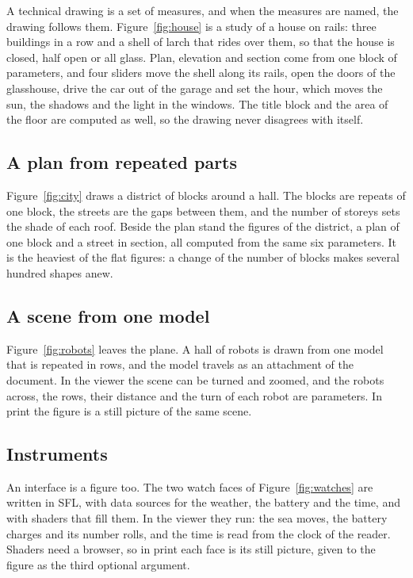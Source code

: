 \documentclass[10pt,twocolumn]{article}
\begin{document}
A technical drawing is a set of measures, and when the measures are named, the drawing follows them. Figure~\ref{fig:house} is a study
of a house on rails: three buildings in a row and a shell of larch that rides over them, so that the house is closed, half open or all
glass. Plan, elevation and section come from one block of parameters, and four sliders move the shell along its rails, open the doors
of the glasshouse, drive the car out of the garage and set the hour, which moves the sun, the shadows and the light in the windows. The
title block and the area of the floor are computed as well, so the drawing never disagrees with itself.

\subsection{A plan from repeated parts}

Figure~\ref{fig:city} draws a district of blocks around a hall. The blocks are repeats of one block, the streets are the gaps between
them, and the number of storeys sets the shade of each roof. Beside the plan stand the figures of the district, a plan of one block
and a street in section, all computed from the same six parameters. It is the heaviest of the flat figures: a change of the number of
blocks makes several hundred shapes anew.

\subsection{A scene from one model}

Figure~\ref{fig:robots} leaves the plane. A hall of robots is drawn from one model that is repeated in rows, and the model travels as an
attachment of the document. In the viewer the scene can be turned and zoomed, and the robots across, the rows, their distance and the
turn of each robot are parameters. In print the figure is a still picture of the same scene.

\subsection{Instruments}

An interface is a figure too. The two watch faces of Figure~\ref{fig:watches} are written in SFL, with data sources for the weather,
the battery and the time, and with shaders that fill them. In the viewer they run: the sea moves, the battery charges and its number
rolls, and the time is read from the clock of the reader. Shaders need a browser, so in print each face is its still picture, given
to the figure as the third optional argument.
\end{document}
